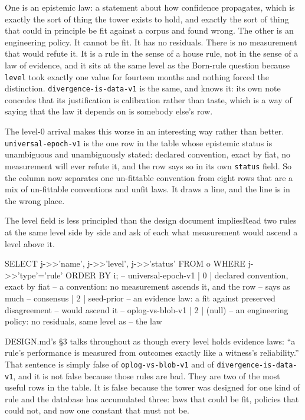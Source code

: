 One is an epistemic law: a statement about how confidence propagates, which is exactly the sort of thing the tower exists to hold, and exactly the sort of thing that could in principle be fit against a corpus and found wrong. The other is an engineering policy. It cannot be fit. It has no residuals. There is no measurement that would refute it. It is a rule in the sense of a house rule, not in the sense of a law of evidence, and it sits at the same level as the Born-rule question because \texttt{level} took exactly one value for fourteen months and nothing forced the distinction. \texttt{divergence-is-data-v1} is the same, and knows it: its own note concedes that its justification is calibration rather than taste, which is a way of saying that the law it depends on is somebody else's row.

The level-0 arrival makes this worse in an interesting way rather than better. \texttt{universal-epoch-v1} is the one row in the table whose epistemic status is unambiguous and unambiguously stated: declared convention, exact by fiat, no measurement will ever refute it, and the row says so in its own \texttt{status} field. So the column now separates one un-fittable convention from eight rows that are a mix of un-fittable conventions and unfit laws. It draws a line, and the line is in the wrong place.

\begin{Correspondence}{The level field is less principled than the design document implies}{Read two rules at the same level side by side and ask of each what measurement would ascend a level above it.}
\begin{Check}
SELECT j->>'name', j->>'level', j->>'status' FROM o WHERE j->>'type'='rule' ORDER BY i;
-- universal-epoch-v1 | 0 | declared convention, exact by fiat
--                          a convention: no measurement ascends it, and the row
--                          says as much
-- consensus          | 2 | seed-prior
--                          an evidence law: a fit against preserved disagreement
--                          would ascend it
-- oplog-vs-blob-v1   | 2 | (null)
--                          an engineering policy: no residuals, same level as
--                          the law
\end{Check}
DESIGN.md's \S3 talks throughout as though every level holds evidence laws: ``a rule's performance is measured from outcomes exactly like a witness's reliability.'' That sentence is simply false of \texttt{oplog-vs-blob-v1} and of \texttt{divergence-is-data-v1}, and it is not false because those rules are bad. They are two of the most useful rows in the table. It is false because the tower was designed for one kind of rule and the database has accumulated three: laws that could be fit, policies that could not, and now one constant that must not be.
\end{Correspondence}

